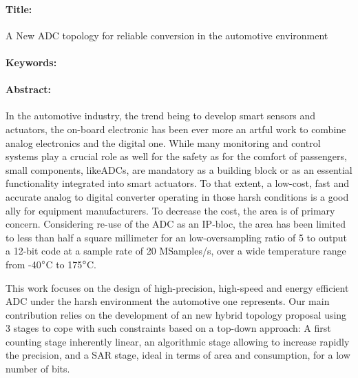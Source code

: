 \clearpage
\begin{mdframed}[linecolor=Prune,linewidth=1]
\vspace{-.25cm}
\paragraph*{Title:} A New ADC topology for reliable conversion in the automotive environment

\begin{small}
\vspace{-.25cm}
\paragraph*{Keywords:} 

\vspace{-.5cm}
\paragraph*{Abstract:} 
In the automotive industry, the trend being to develop smart sensors and actuators, the on-board electronic has been ever more an artful work to combine analog electronics and the digital one. While many monitoring and control systems play a crucial role as well for the safety as for the comfort of passengers, small components, likeADCs, are mandatory as a building block or as an essential functionality integrated into smart actuators. To that extent, a low-cost, fast and accurate analog to digital converter operating in those harsh conditions is a good ally for equipment manufacturers. To decrease the cost, the area is of primary concern. Considering re-use of the ADC as an IP-bloc, the area has been limited to less than half a square millimeter for an low-oversampling ratio of 5 to output a 12-bit code at a sample rate of 20 MSamples/s, over a wide temperature range from -40\(\degree \)C to 175\(\degree \)C.

This work focuses on the design of high-precision, high-speed and energy efficient ADC under the harsh environment the automotive one represents. Our main contribution relies on the development of an new hybrid topology proposal using 3 stages to cope with such constraints based on a top-down approach: A first counting stage inherently linear, an algorithmic stage allowing to increase rapidly the precision, and a SAR stage, ideal in terms of area and consumption, for a low number of bits.


\end{small}
\end{mdframed}
